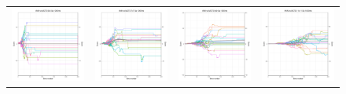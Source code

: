 \begin{figure}
\begin{tabular}{cccc}
\hspace{-0.5cm}\includegraphics[width = 1.55in]{images/Visualizations/ANNvsMCTS/1000ms5x5.png} &
\hspace{-0.5cm}\includegraphics[width = 1.55in]{images/Visualizations/ANNvsMCTS/1000ms7x7.png} &
\hspace{-0.5cm}\includegraphics[width = 1.55in]{images/Visualizations/ANNvsMCTS/1000ms9x9.png} &
\hspace{-0.5cm}\includegraphics[width = 1.55in]{images/Visualizations/ANNvsMCTS/1000ms11x11.png} \\


\end{tabular}
\end{figure}
